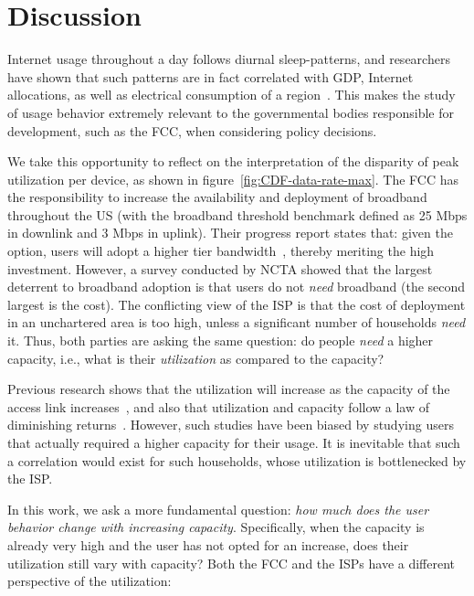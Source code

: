 \section{Discussion}\label{sec:discussion}

Internet usage throughout a day follows diurnal sleep-patterns, and researchers
have shown that such patterns are in fact correlated with GDP, Internet 
allocations, as well as electrical consumption of 
a region~\cite{ant-diurnal-web}. This makes the study of usage behavior 
extremely relevant to the governmental bodies responsible
for development, such as the FCC, when considering policy decisions.


We take this opportunity to reflect on the
interpretation of the disparity of peak utilization per device, as shown in
figure~\ref{fig:CDF-data-rate-max}. The FCC has the responsibility to increase 
the availability and deployment of broadband
throughout the US (with the broadband threshold benchmark defined as 25 Mbps in downlink and
3 Mbps in uplink). Their progress report states that: given the option, users will adopt a
higher tier bandwidth~\cite{}, thereby meriting the high investment. However, a survey
conducted by NCTA showed that the largest deterrent to broadband adoption is that users
do not \emph{need} broadband (the second largest is the cost). The conflicting view of 
the ISP is that the cost of deployment in an unchartered area is too high, unless
a significant number of households \emph{need} it. Thus, both parties are asking the same
question: do people \emph{need} a higher capacity, i.e., what is their \emph{utilization}
as compared to the capacity?

Previous research shows that the utilization will increase as the capacity of the access
link increases~\cite{}, and also that utilization and capacity
follow a law of diminishing returns~\cite{dasu-imc2014}. However, such
studies have been biased by studying users that actually required a higher capacity
for their usage. It is inevitable that such a correlation would exist for 
such households, whose utilization is bottlenecked by the ISP.

In this work, we ask a more fundamental question: \emph{how much does the user behavior
change with increasing capacity}. Specifically, when the capacity is already very high
and the user has not opted for an increase, does their utilization still vary with capacity?
Both the FCC and the ISPs have a different perspective of the utilization:


